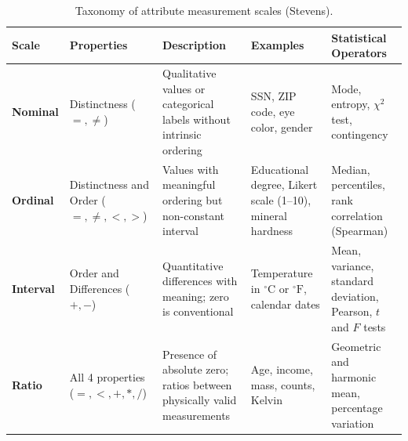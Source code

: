 \begin{table}[H]
\centering
\footnotesize
\begin{tabularx}{\textwidth}{l p{2.2cm} X p{2.6cm} p{3.0cm}}
\toprule
\textbf{Scale} & \textbf{Properties} & \textbf{Description} & \textbf{Examples} & \textbf{Statistical Operators} \\
\midrule
\textbf{Nominal} & Distinctness ($=, \neq$) & Qualitative values or categorical labels without intrinsic ordering & SSN, ZIP code, eye color, gender & Mode, entropy, $\chi^2$ test, contingency \\
\addlinespace
\textbf{Ordinal} & Distinctness and Order ($=, \neq, <, >$) & Values with meaningful ordering but non-constant interval & Educational degree, Likert scale (1--10), mineral hardness & Median, percentiles, rank correlation (Spearman) \\
\addlinespace
\textbf{Interval} & Order and Differences ($+, -$) & Quantitative differences with meaning; zero is conventional & Temperature in $^\circ\text{C}$ or $^\circ\text{F}$, calendar dates & Mean, variance, standard deviation, Pearson, $t$ and $F$ tests \\
\addlinespace
\textbf{Ratio} & All 4 properties ($=, <, +, *, /$) & Presence of absolute zero; ratios between physically valid measurements & Age, income, mass, counts, Kelvin & Geometric and harmonic mean, percentage variation \\
\bottomrule
\end{tabularx}
\caption{Taxonomy of attribute measurement scales (Stevens).}
\label{tab:attribute-types}
\end{table}

